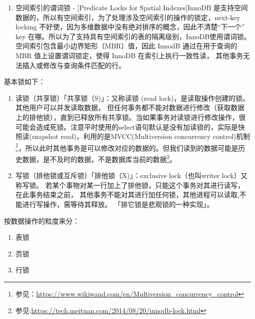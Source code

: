 \documentclass[../../../interview-questions.tex]{subfiles}
\begin{document}
\begin{enumerate}
    0，只用 Auto-Inc Lock。
    1，默认值，对于插入前已知插入行数的插入，用互斥量，对于插入前不知道具体插入数的插入，用 Auto-Inc Lock，这样即使基于 statement -based binlog 复制也是安全的。
    2，只用互斥量。
    \item {空间索引的谓词锁 - [Predicate Locks for Spatial Indexes]}InnoDB 是支持空间数据的，所以有空间索引，为了处理涉及空间索引的操作的锁定，next-key locking 不好使，因为多维数据中没有绝对排序的概念，因此不清楚“下一个” key 在哪。所以为了支持具有空间索引的表的隔离级别，InnoDB使用谓词锁。空间索引包含最小边界矩形（MBR）值，因此 InnodB 通过在用于查询的 MBR 值上设置谓词锁定，使得 InnoDB 在索引上执行一致性读， 其他事务无法插入或修改与查询条件匹配的行。
\end{enumerate}

基本锁如下：

\begin{enumerate}
    \item{读锁（共享锁）}「共享锁（S)」：又称读锁 (read lock)，是读取操作创建的锁。其他用户可以并发读取数据， 但任何事务都不能对数据进行修改（获取数据上的排他锁），直到已释放所有共享锁。当如果事务对读锁进行修改操作，很可能会造成死锁。注意平时使用的select语句默认是没有加读锁的，实际是快照读(snapshot read)，利用的是MVCC(Multiversion concurrency control)机制\footnote{参见：\url{https://www.wikiwand.com/en/Multiversion_concurrency_control}}，所以此时其他事务是可以修改对应的数据的。但我们读到的数据可能是历史数据，是不及时的数据，不是数据库当前的数据\footnote{参见:\url{https://tech.meituan.com/2014/08/20/innodb-lock.html}}。
    \item{写锁（排他锁或互斥锁）}「排他锁（X)」：exclusive lock（也叫writer lock）又称写锁。 若某个事物对某一行加上了排他锁，只能这个事务对其进行读写，在此事务结束之前， 其他事务不能对其进行加任何锁，其他进程可以读取,不能进行写操作，需等待其释放。 「排它锁是悲观锁的一种实现」。
\end{enumerate}

按数据操作的粒度来分：

\begin{enumerate}
    \item{表锁}
    \item{页锁}
    \item{行锁}
\end{enumerate}
\end{document}
